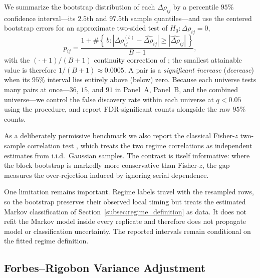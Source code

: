 We summarize the bootstrap distribution of each $\Delta\rho_{ij}$ by a percentile $95\%$ confidence interval---its $2.5$th and $97.5$th sample quantiles---and use the centered bootstrap errors for an approximate two-sided test of $H_0:\Delta\rho_{ij}=0$,
\begin{equation}
p_{ij}
=
\frac{
1 + \#\left\{\,b:
\left|\Delta\rho_{ij}^{(b)}-\widehat{\Delta\rho}_{ij}\right|
\geq
\left|\widehat{\Delta\rho}_{ij}\right|
\,\right\}
}{B+1},
\label{eq:boot_pvalue}
\end{equation}
with the $(\cdot + 1)/(B + 1)$ continuity correction of \citet{davisonhinkley1997}; the smallest attainable value is therefore $1/(B + 1) \approx 0.0005$. A pair is a \emph{significant increase} (\emph{decrease}) when its $95\%$ interval lies entirely above (below) zero. Because each universe tests many pairs at once---$36$, $15$, and $91$ in Panel~A, Panel~B, and the combined universe---we control the false discovery rate within each universe at $q < 0.05$ using the \citet{benjaminihochberg1995} procedure, and report FDR-significant counts alongside the raw $95\%$ counts.

As a deliberately permissive benchmark we also report the classical Fisher-$z$ two-sample correlation test \citep{fisher1921probable}, which treats the two regime correlations as independent estimates from i.i.d.\ Gaussian samples. The contrast is itself informative: where the block bootstrap is markedly more conservative than Fisher-$z$, the gap measures the over-rejection induced by ignoring serial dependence.

One limitation remains important. Regime labels travel with the resampled rows, so the bootstrap preserves their observed local timing but treats the estimated Markov classification of Section~\ref{subsec:regime_definition} as data. It does not refit the Markov model inside every replicate and therefore does not propagate model or classification uncertainty. The reported intervals remain conditional on the fitted regime definition.

\subsection{Forbes--Rigobon Variance Adjustment}
\label{subsec:forbes_rigobon}

